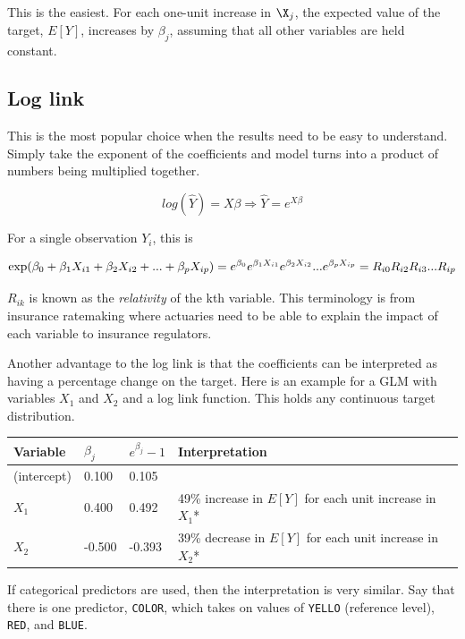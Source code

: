 \documentclass[openany]{book}
\begin{document}
This is the easiest. For each one-unit increase in \(\X_j\), the expected value of the target, \(E[Y]\), increases by \(\beta_j\), assuming that all other variables are held constant.

\hypertarget{log-link}{%
\subsection{Log link}\label{log-link}}

This is the most popular choice when the results need to be easy to understand. Simply take the exponent of the coefficients and model turns into a product of numbers being multiplied together.

\[
log(\hat{Y}) = X\beta \Rightarrow \hat{Y} = e^{X \beta}
\]

For a single observation \(Y_i\), this is

\[
\text{exp}(\beta_0 + \beta_1 X_{i1} + \beta_2 X_{i2} + ... + \beta_p X_{ip}) = \\
e^{\beta_0} e^{\beta_1 X_{i1}}e^{\beta_2 X_{i2}} ...  e^{\beta_p X_{ip}} = 
R_{i0} R_{i2} R_{i3} ... R_{ip}
\]

\(R_{ik}\) is known as the \emph{relativity} of the kth variable. This terminology is from insurance ratemaking where actuaries need to be able to explain the impact of each variable to insurance regulators.

Another advantage to the log link is that the coefficients can be interpreted as having a percentage change on the target. Here is an example for a GLM with variables \(X_1\) and \(X_2\) and a log link function. This holds any continuous target distribution.

\begin{longtable}[]{@{}llll@{}}
\toprule
Variable & \(\beta_j\) & \(e^{\beta_j} - 1\) & Interpretation\tabularnewline
\midrule
\endhead
(intercept) & 0.100 & 0.105 &\tabularnewline
\(X_1\) & 0.400 & 0.492 & 49\% increase in \(E[Y]\) for each unit increase in \(X_1\)*\tabularnewline
\(X_2\) & -0.500 & -0.393 & 39\% decrease in \(E[Y]\) for each unit increase in \(X_2\)*\tabularnewline
\bottomrule
\end{longtable}

If categorical predictors are used, then the interpretation is very similar. Say that there is one predictor, \texttt{COLOR}, which takes on values of \texttt{YELLO} (reference level), \texttt{RED}, and \texttt{BLUE}.
\end{document}
